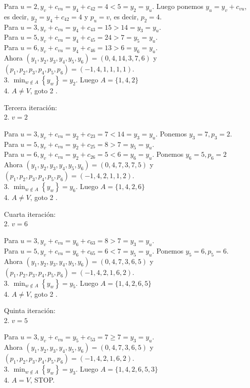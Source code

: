 \documentclass[10pt]{article}
\begin{document}
Para $u=2, y_{v}+c_{v u}=y_{4}+c_{42}=4<5=y_{2}=y_{u}$. Luego ponemos $y_{u}=y_{v}+c_{v u}$, es decir, $y_{2}=y_{4}+c_{42}=4$ y $p_{u}=v$, es decir, $p_{2}=4$.\\
Para $u=3, y_{v}+c_{v u}=y_{4}+c_{43}=15>14=y_{3}=y_{u}$.\\
Para $u=5, y_{v}+c_{v u}=y_{4}+c_{45}=24>7=y_{5}=y_{u}$.\\
Para $u=6, y_{v}+c_{v u}=y_{4}+c_{46}=13>6=y_{6}=y_{u}$.\\
Ahora $\left(y_{1}, y_{2}, y_{3}, y_{4}, y_{5}, y_{6}\right)=(0,4,14,3,7,6)$ y $\left(p_{1}, p_{2}, p_{3}, p_{4}, p_{5}, p_{6}\right)=(-1,4,1,1,1,1)$.\\
3. $\min _{w \notin A}\left\{y_{w}\right\}=y_{2}$. Luego $A=\{1,4,2\}$\\
4. $A \neq V$, goto 2 .

Tercera iteración:\\
2. $v=2$

Para $u=3, y_{v}+c_{v u}=y_{2}+c_{23}=7<14=y_{3}=y_{u}$. Ponemos $y_{3}=7, p_{3}=2$.\\
Para $u=5, y_{v}+c_{v u}=y_{2}+c_{25}=8>7=y_{5}=y_{u}$.\\
Para $u=6, y_{v}+c_{v u}=y_{2}+c_{26}=5<6=y_{6}=y_{u}$. Ponemos $y_{6}=5, p_{6}=2$\\
Ahora $\left(y_{1}, y_{2}, y_{3}, y_{4}, y_{5}, y_{6}\right)=(0,4,7,3,7,5)$ y $\left(p_{1}, p_{2}, p_{3}, p_{4}, p_{5}, p_{6}\right)=(-1,4,2,1,1,2)$.\\
3. $\min _{w \notin A}\left\{y_{w}\right\}=y_{6}$. Luego $A=\{1,4,2,6\}$\\
4. $A \neq V$, goto 2 .

Cuarta iteración:\\
2. $v=6$

Para $u=3, y_{v}+c_{v u}=y_{6}+c_{63}=8>7=y_{3}=y_{u}$.\\
Para $u=5, y_{v}+c_{v u}=y_{6}+c_{65}=6<7=y_{5}=y_{u}$. Ponemos $y_{5}=6, p_{5}=6$.\\
Ahora $\left(y_{1}, y_{2}, y_{3}, y_{4}, y_{5}, y_{6}\right)=(0,4,7,3,6,5)$ y $\left(p_{1}, p_{2}, p_{3}, p_{4}, p_{5}, p_{6}\right)=(-1,4,2,1,6,2)$.\\
3. $\min _{w \notin A}\left\{y_{w}\right\}=y_{5}$. Luego $A=\{1,4,2,6,5\}$\\
4. $A \neq V$, goto 2 .

Quinta iteración:\\
2. $v=5$

Para $u=3, y_{v}+c_{v u}=y_{5}+c_{53}=7 \geq 7=y_{3}=y_{u}$.\\
Ahora $\left(y_{1}, y_{2}, y_{3}, y_{4}, y_{5}, y_{6}\right)=(0,4,7,3,6,5)$ y $\left(p_{1}, p_{2}, p_{3}, p_{4}, p_{5}, p_{6}\right)=(-1,4,2,1,6,2)$.\\
3. $\min _{w \notin A}\left\{y_{w}\right\}=y_{3}$. Luego $A=\{1,4,2,6,5,3\}$\\
4. $A=V$, STOP.
\end{document}

